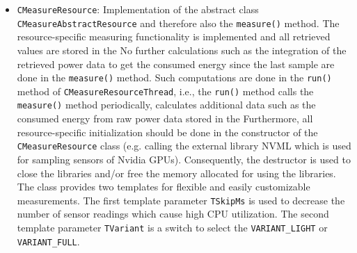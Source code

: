 \begin{description}
\begin{itemize}
		\item \texttt{CMeasureResource}: Implementation of the abstract class\\\texttt{CMeasureAbstractResource} and therefore also the \texttt{measure()} method. The resource-specific measuring functionality is implemented and all retrieved values are stored in the  No further calculations such as the integration of the retrieved power data to get the consumed energy since the last sample are done in the \texttt{measure()} method. Such computations are done in the \texttt{run()} method of \texttt{CMeasureResourceThread}, i.e., the \texttt{run()} method calls the \texttt{measure()} method periodically, calculates additional data such as the consumed energy from raw power data stored in the  Furthermore, all resource-specific initialization should be done in the constructor of the \texttt{CMeasureResource} class (e.g. calling the external library NVML which is used for sampling sensors of Nvidia GPUs). Consequently, the destructor is used to close the libraries and/or free the memory allocated for using the libraries. The class provides two templates for flexible and easily customizable measurements. The first template parameter \texttt{TSkipMs} is used to decrease the number of sensor readings which cause high CPU utilization. The second template parameter \texttt{TVariant} is a switch to select the \texttt{VARIANT\_LIGHT} or \texttt{VARIANT\_FULL}. 
		

\end{itemize}
\end{description}
